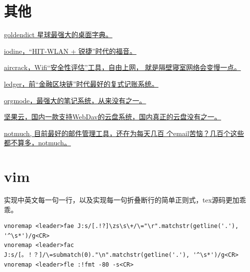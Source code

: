 \section{其他}

\href{https://github.com/goldendict/goldendict}{goldendict 星球最强大的桌面字典。}

\href{https://github.com/yarrick/iodine}{iodine，“HIT-WLAN + 锐捷”时代的福音。}

\href{http://www.aircrack-ng.org/}{aircrack，Wifi“安全性评估”工具，自由上网，
  就是隔壁寝室网络会变慢一点。}

\href{https://www.ledger-cli.org/}{ledger，前“金融区块链”时代最好的复式记账系统。}

\href{https://orgmode.org/}{orgmode，最强大的笔记系统，从来没有之一。}

\href{https://www.jianguoyun.com/}{坚果云，国内一款支持WebDav的云盘系统，国内真正的云盘没有之一。}

\href{https://notmuchmail.org/}{notmuch, 目前最好的邮件管理工具，还在为每天几百
  个email苦恼？几百个这些都不算多，notmuch。}

\section{vim}
实现中英文每一句一行，以及实现每一句折叠断行的简单正则式，tex源码更加乖乖。
\begin{lstlisting}
vnoremap <leader>fae J:s/[.!?]\zs\s\+/\="\r".matchstr(getline('.'), '^\s*')/g<CR>
vnoremap <leader>fac J:s/[。！？]/\=submatch(0)."\n".matchstr(getline('.'), '^\s*')/g<CR>
vnoremap <leader>fle :!fmt -80 -s<CR>
\end{lstlisting}
